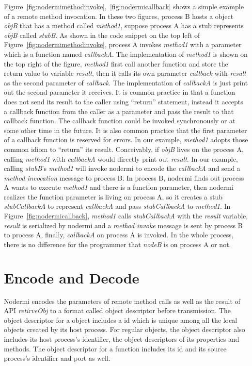 \nodrmimethodinvokefig{}
\nodrmicallbackfig{}

Figure~\ref{fig:nodermimethodinvoke},~\ref{fig:nodermicallback} shows a simple example
of a remote method invocation. 
In these two figures, process B hosts a object \emph{objB} that has a method called \emph{method1},
suppose process A has a stub represents \emph{objB} called \emph{stubB}.
As shown in the code snippet on the top left of Figure~\ref{fig:nodermimethodinvoke},
process A invokes \emph{method1} with a parameter which is a function named \emph{callbackA}. 
The implementation of \emph{method1} is shown on the top right of the figure,
\emph{method1} first call another function and store the return value to variable \emph{result}, 
then it calls its own parameter \emph{callback} with \emph{result} as the second parameter
of \emph{callback}.
The implementation of \emph{callbackA} is just print out the second parameter it receives.
It is common practice in \js{} that a function does not send its result to the caller using ``return'' 
statement,
instead it accepts a callback function from the caller as a parameter 
and pass the result to that callback function.
The callback function could be invoked synchronously or at some other time in the future.
It is also  
common practice that the first parameter of a callback function is reserved for errors.
In our example, \emph{method1} adopts those common idiom to ``return'' its result.
Conceivably, if \emph{objB} lives on the process A, calling \emph{method1} with
\emph{callbackA} would directly print out \emph{result}.
In our example, calling \emph{stubB}'s \emph{method1} will invoke nodermi to 
encode the \emph{callbackA} and send a \emph{method invocation} message to process B.
In process B, nodermi finds out process A wants to execute \emph{method1} and
there is a function parameter, 
then nodermi realizes the function parameter is living on process A,
so it creates a stub \emph{stubCallbackA} to represent \emph{callbackA} and pass
\emph{stubCallbackA} to \emph{method1}.
In Figure~\ref{fig:nodermicallback}, 
\emph{method1} calls \emph{stubCallbackA} with the \emph{result} variable,
\emph{result} is serialized by nodermi and a \emph{method invoke} message is sent
by process B to process A, finally, \emph{callbackA} on process A is invoked.
In the whole process, there is no difference for the programmer that \emph{nodeB}
is on process A or not.

\section{Encode and Decode}
Nodermi encodes the parameters of remote method calls as well as
the result of API \emph{retirveObj} to a format called object descriptor
before transmission.
The object descriptor for a object includes a id which is unique
among all the local objects created by its host process.
For regular objects, the object descriptor also includes
its host process's identifier, the object descriptors of its properties and methods.
The object descriptor for a function includes
its id and its source process's identifier and port as well.

